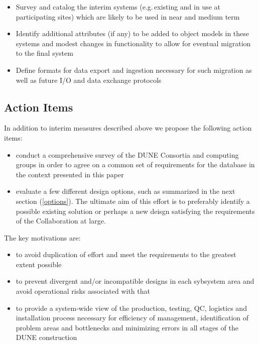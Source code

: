 \documentclass[pdftex,12pt,letter]{article}
\begin{document}
\begin{itemize}

\item Survey and catalog the interim systems (e.g.\,existing and in use at participating sites)
which are likely to be used in near and medium term

\item Identify additional attributes (if any) to be added to object models in these systems
and modest changes in functionality to allow for eventual migration to the final system

\item Define formats for data export and ingestion necessary for such migration as well as future
I/O and data exchange protocols

\end{itemize}

\subsection{Action Items}
In addition to interim measures described above we propose the following action items:
\begin{itemize}

\item conduct a comprehensive survey of the DUNE Consortia and computing groups
in order to agree on a common set of requirements for the database in the context presented
in this paper

\item evaluate a few different design options, such as summarized in the
next section (\ref{options}). The ultimate aim of this effort is to preferably identify a possible
existing solution or perhaps a new deisgn satisfying the requirements of the Collaboration at large. 

\end{itemize}

\noindent The key motivations are:

\begin{itemize}

\item to avoid duplication of effort and meet the requirements to the greatest extent possible

\item to prevent divergent and/or incompatible designs in each sybsystem area and avoid operational risks associated with that

\item to provide a system-wide view of the production, testing, QC, logistics and installation process necessary
for efficiency of management, identification of problem areas and bottlenecks and minimizing errors in all stages
of the DUNE construction

\end{itemize}
\end{document}
